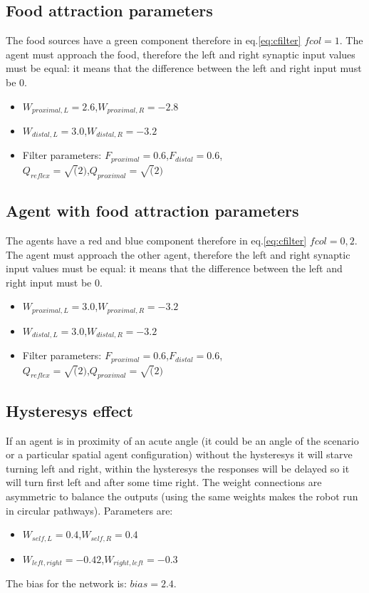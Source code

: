 \subsection{Food attraction parameters}
The food sources have a green component therefore in eq.\ref{eq:cfilter} $fcol=1$.
The agent must approach the food, therefore the left and right synaptic input
values must be equal: it means that the difference between the left and
right input must be 0.
\begin{itemize}
 \item $W_{proximal,L}=2.6$,$W_{proximal,R}=-2.8$
 \item $W_{distal,L}=3.0$,$W_{distal,R}=-3.2$
 \item Filter parameters: $F_{proximal}=0.6$,$F_{distal}=0.6$,\\$Q_{reflex}=\sqrt(2)$,$Q_{proximal}=\sqrt(2)$
\end{itemize}

\subsection{Agent with food attraction parameters}
The agents have a red and blue component therefore in eq.\ref{eq:cfilter} $fcol=0,2$.
The agent must approach the other agent, therefore the left and right synaptic
input values must be equal: it means that the difference between the left
and right input must be 0.
\begin{itemize}
 \item $W_{proximal,L}=3.0$,$W_{proximal,R}=-3.2$
 \item $W_{distal,L}=3.0$,$W_{distal,R}=-3.2$
 \item Filter parameters: $F_{proximal}=0.6$,$F_{distal}=0.6$,\\$Q_{reflex}=\sqrt(2)$,$Q_{proximal}=\sqrt(2)$
\end{itemize}

\subsection{Hysteresys effect}
\label{Appendix:HysteresysValue}
If an agent is in proximity of an acute angle (it could be an angle of the
scenario or a particular spatial agent configuration) without the hysteresys
it will starve turning left and right, within the hysteresys the responses will
be delayed so it will turn first left and after some time right.
The weight connections are asymmetric to balance the outputs (using the same
weights makes the robot run in circular pathways).
Parameters are:
\begin{itemize}
 \item $W_{self,L}=0.4$,$W_{self,R}=0.4$
 \item $W_{left,right}=-0.42$,$W_{right,left}=-0.3$
\end{itemize}
The bias for the network is: $bias=2.4$.
